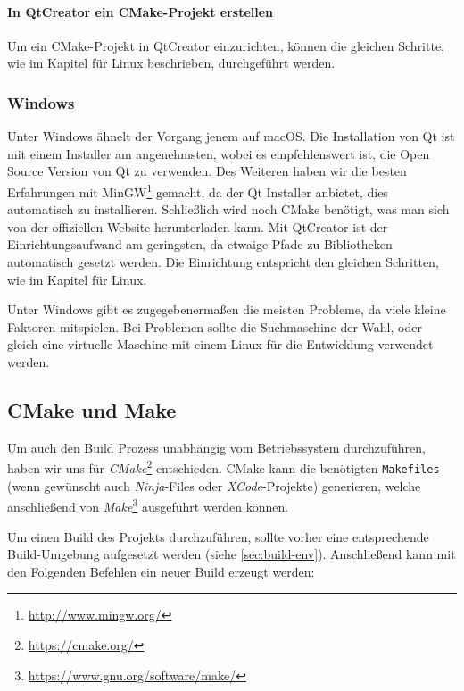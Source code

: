 \paragraph{In QtCreator ein CMake-Projekt erstellen}

Um ein CMake-Projekt in QtCreator einzurichten, können die gleichen Schritte, wie
im Kapitel für Linux beschrieben, durchgeführt werden.

\subsubsection{Windows}

Unter Windows ähnelt der Vorgang jenem auf macOS. Die Installation von Qt ist
mit einem Installer am angenehmsten, wobei es empfehlenswert ist, die Open
Source Version von Qt zu verwenden. Des Weiteren haben wir die besten
Erfahrungen mit MinGW\footnote{\url{http://www.mingw.org/}} gemacht, da der Qt
Installer anbietet, dies automatisch zu installieren. Schließlich wird noch
CMake benötigt, was man sich von der offiziellen Website herunterladen kann. Mit
QtCreator ist der Einrichtungsaufwand am geringsten, da etwaige Pfade zu
Bibliotheken automatisch gesetzt werden. Die Einrichtung entspricht den
gleichen Schritten, wie im Kapitel für Linux.

Unter Windows gibt es zugegebenermaßen die meisten Probleme, da viele kleine
Faktoren mitspielen. Bei Problemen sollte die Suchmaschine der Wahl, oder gleich
eine virtuelle Maschine mit einem Linux für die Entwicklung verwendet werden.

\pagebreak
\subsection{CMake und Make}
\label{sec:cmake-make}

Um auch den Build Prozess unabhängig vom Betriebssystem durchzuführen, haben wir
uns für \emph{CMake}\footnote{\url{https://cmake.org/}} entschieden. CMake kann
die benötigten \texttt{Makefiles} (wenn gewünscht auch \emph{Ninja}-Files oder
\emph{XCode}-Projekte) generieren, welche anschließend von
\emph{Make}\footnote{\url{https://www.gnu.org/software/make/}} ausgeführt werden
können.

Um einen Build des Projekts durchzuführen, sollte vorher eine entsprechende
Build-Umgebung aufgesetzt werden (siehe \autoref{sec:build-env}). Anschließend
kann mit den Folgenden Befehlen ein neuer Build erzeugt werden:

